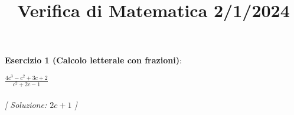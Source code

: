 \documentclass{article}
\title{\raggedright Verifica di Matematica  2/1/2024}
\date{}
\begin{document}
\maketitle

\textbf{Esercizio 1 (Calcolo letterale con frazioni)}:\\
\par $\frac{4c^3 - c^2 + 3c + 2}{c^2 + 2c - 1}$ \\\\

\textit{[ Soluzione: $2c + 1$ ]}\\\\
\end{document}
